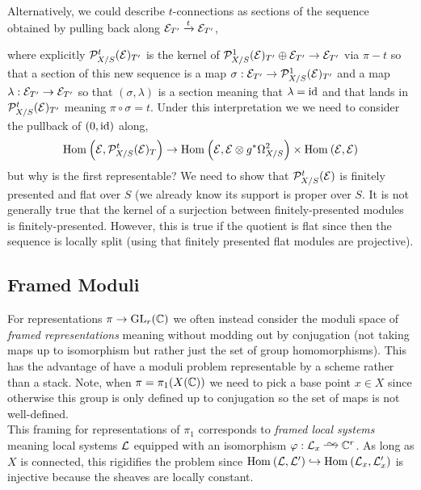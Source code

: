 \documentclass[12pt]{article}
\begin{document}
\begin{rmk}
Alternatively, we could describe $t$-connections  as sections of the sequence obtained by pulling back along $\mathcal{E}_{T'} \xrightarrow{t} \mathcal{E}_{T'}$,
\begin{center}
\end{center}
where explicitly $\mathcal{P}^{t}_{X/S}(\mathcal{E})_{T'}$ is the kernel of $\mathcal{P}^1_{X/S}(\mathcal{E})_{T'} \oplus \mathcal{E}_{T'} \to \mathcal{E}_{T'}$ via $\pi - t$ so that a section of this new sequence is a map $\sigma : \mathcal{E}_{T'} \to \mathcal{P}^1_{X/S}(\mathcal{E})_{T'}$ and a map $\lambda : \mathcal{E}_{T'} \to \mathcal{E}_{T'}$ so that $(\sigma, \lambda)$ is a section meaning that $\lambda = \mathrm{id}$ and that lands in $\mathcal{P}^{t}_{X/S}(\mathcal{E})_{T'}$ meaning $\pi \circ \sigma = t$. Under this interpretation we we need to consider the pullback of $(0, \mathrm{id})$ along,
\[ \mathrm{Hom}_{} \left( \mathcal{E}, \mathcal{P}^t_{X/S}(\mathcal{E})_{T} \right) \to \mathrm{Hom}_{} \left( \mathcal{E}, \mathcal{E} \otimes g^* \Omega^2_{X/S} \right) \times \mathrm{Hom}_{} \left( \mathcal{E}, \mathcal{E} \right) \]
but why is the first representable? We need to show that $\mathcal{P}^t_{X/S}(\mathcal{E})$ is finitely presented and flat over $S$ (we already know its support is proper over $S$. It is not generally true that the kernel of a surjection between finitely-presented modules is finitely-presented. However, this is true if the quotient is flat since then the sequence is locally split (using that finitely presented flat modules are projective).
\end{rmk}

\subsection{Framed Moduli}

For representations $\pi \to \mathrm{GL}_r(\mathbb{C})$ we often instead consider the moduli space of \textit{framed representations} meaning without modding out by conjugation (not taking maps up to isomorphism but rather just the set of group homomorphisms). This has the advantage of have a moduli problem representable by a scheme rather than a stack. Note, when $\pi = \pi_1(X(\mathbb{C}))$ we need to pick a base point $x \in X$ since otherwise this group is only defined up to conjugation so the set of maps is not well-defined.
\bigskip\\
This framing for representations of $\pi_1$ corresponds to \textit{framed local systems} meaning local systems $\mathcal{L}$ equipped with an isomorphism $\varphi : \L_x \iso \CC^r$. As long as $X$ is connected, this rigidifies the problem since $\mathrm{Hom}_{} \left( \mathcal{L}, \mathcal{L}' \right) \hookrightarrow \mathrm{Hom}_{} \left( \mathcal{L}_x, \mathcal{L}_x' \right)$ is injective because the sheaves are locally constant. 
\end{document}
